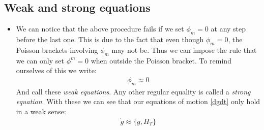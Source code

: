 \documentclass[11pt]{article}
\numberwithin{equation}{section}
\begin{document}
   \subsection{Weak and strong equations}{}
   \begin{itemize}
     \item We can notice that the above procedure fails if we set $\phi_m=0$ at any step before the last one. This is due to the fact that even though $\phi_m=0$, the Poisson brackets involving $\phi_m$ may not be. Thus we can impose the rule that we can only set $\phi^m=0$ when outside the Poisson bracket. To remind ourselves of this we write:
     \begin{align*}
        \phi_m \approx 0 
      \end{align*} 
      And call these \emph{weak equations}. Any other regular equality is called a \emph{strong equation}. With these we can see that our equations of motion \ref{dgdt} only hold in a weak sense:
      \begin{align}
      \label{g_dot}
        \dot{g} \approx \{g,H_T\}
      \end{align}
   \end{itemize}
\end{document}
